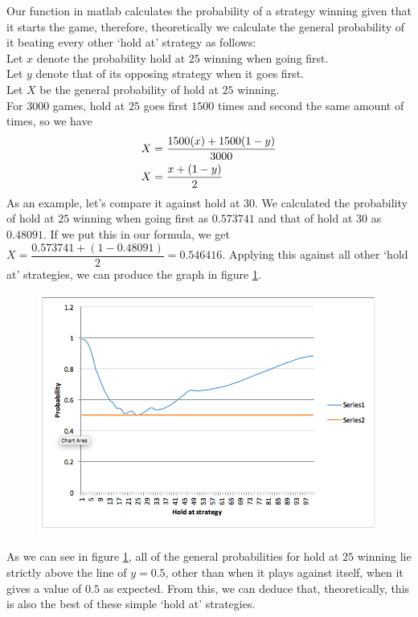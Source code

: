 \documentclass[a4paper,titlepage]{article}
\begin{document}
Our function in matlab calculates the probability of a strategy winning given that it starts the game, therefore, theoretically we calculate the general probability of it beating every other ‘hold at’ strategy as follows:\\
Let $x$ denote the probability hold at $25$ winning when going first.\\
Let $y$ denote that of its opposing strategy when it goes first.\\
Let $X$ be the general probability of hold at $25$ winning.\\
For $3000$ games, hold at $25$ goes first $1500$ times and second the same amount of times, so we have 
\begin{align}
X &= \dfrac{1500(x)+1500(1-y)}{3000}\notag\\
X &= \dfrac{x+(1-y)}{2}\notag
\end{align}
As an example, let’s compare it against hold at $30$. We calculated the probability of hold at $25$ winning when going first as $0.573741$ and that of hold at $30$ as $0.48091$. If we put this in our formula, we get\\ $X=\dfrac{0.573741+(1-0.48091)}{2}=0.546416$. Applying this against all other ‘hold at’ strategies, we can produce the graph in figure \ref{figure7}.
\begin{figure}
\centering
\includegraphics[width=\textwidth]{stats_3}
\caption{\label{figure7}}
\end{figure}
As we can see in figure \ref{figure7}, all of the general probabilities for hold at $25$ winning lie strictly above the line of $y=0.5$, other than when it plays against itself, when it gives a value of $0.5$ as expected. From this, we can deduce that, theoretically, this is also the best of these simple ‘hold at’ strategies.\\ \\
\end{document}

